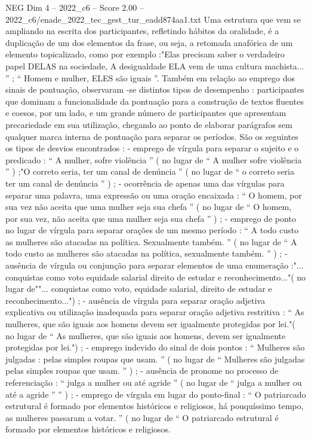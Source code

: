 \begin{textsample}{NEG Dim 4 – 2022\_c6 – Score 2.00 – 2022\_c6/enade\_2022\_tec\_gest\_tur\_eadd874aa1.txt}
Uma estrutura que vem se ampliando na escrita dos participantes, refletindo hábitos da oralidade, é a duplicação de um dos elementos da frase, ou seja, a retomada anafórica de um elemento topicalizado, como por exemplo :"Elas precisam saber o verdadeiro papel DELAS na sociedade, A desigualdade ELA vem de uma cultura machista... ” ; “ Homem e mulher, ELES são iguais ”.
Também em relação ao emprego dos sinais de pontuação, observaram -se distintos tipos de desempenho : participantes que dominam a funcionalidade da pontuação para a construção de textos fluentes e coesos, por um lado, e um grande número de participantes que apresentam precariedade em sua utilização, chegando ao ponto de elaborar parágrafos sem qualquer marca interna de pontuação para separar os períodos.
São os seguintes os tipos de desvios encontrados : - emprego de vírgula para separar o sujeito e o predicado : “ A mulher, sofre violência ” ( no lugar de “ A mulher sofre violência ” ) ;"O correto seria, ter um canal de denúncia ” ( no lugar de “ o correto seria ter um canal de denúncia ” ) ; - ocorrência de apenas uma das vírgulas para separar uma palavra, uma expressão ou uma oração encaixada : “ O homem, por sua vez não aceita que uma mulher seja sua chefa ” ( no lugar de “ O homem, por sua vez, não aceita que uma mulher seja sua chefa ” ) ; - emprego de ponto no lugar de vírgula para separar orações de um mesmo período : “ A todo custo as mulheres são atacadas na política.
Sexualmente também. ” ( no lugar de “ A todo custo as mulheres são atacadas na política, sexualmente também. ” ) ; - ausência de vírgula ou conjunção para separar elementos de uma enumeração :"... conquistas como voto equidade salarial direito de estudar e reconhecimento..."( no lugar de""... conquistas como voto, equidade salarial, direito de estudar e reconhecimento...") ; - ausência de vírgula para separar oração adjetiva explicativa ou utilização inadequada para separar oração adjetiva restritiva : “ As mulheres, que são iguais aos homens devem ser igualmente protegidas por lei."( no lugar de “ As mulheres, que são iguais aos homens, devem ser igualmente protegidas por lei.") ; - emprego indevido do sinal de dois pontos : “ Mulheres são julgadas : pelas simples roupas que usam. ” ( no lugar de “ Mulheres são julgadas pelas simples roupas que usam. ” ) ; - ausência de pronome no processo de referenciação : “ julga a mulher ou até agride ” ( no lugar de “ julga a mulher ou até a agride ” ” ) ; - emprego de vírgula em lugar do ponto-final : “ O patriarcado estrutural é formado por elementos históricos e religiosos, há pouquíssimo tempo, as mulheres passaram a votar. ” ( no lugar de “ O patriarcado estrutural é formado por elementos históricos e religiosos.

\end{textsample}
